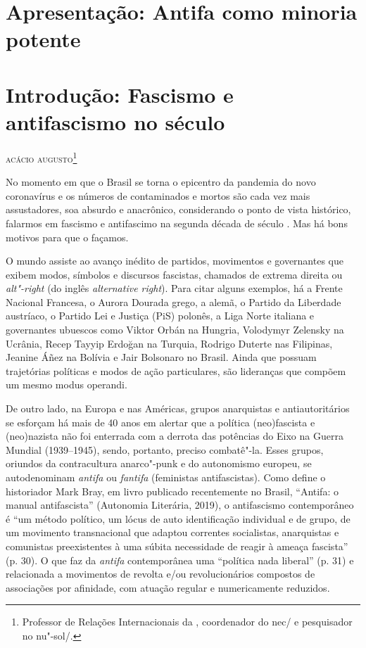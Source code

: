 
\chapter{Apresentação: Antifa como minoria potente}

\lipsum[5]
\lipsum[2]
\lipsum[1]

\chapter{Introdução: Fascismo e antifascismo no século }

\hfill{}\textsc{acácio augusto\footnote{Professor de Relações Internacionais da , coordenador do nec/ e pesquisador no nu"-sol/.}}

\bigskip

No momento em que o Brasil se torna o epicentro da pandemia do novo
coronavírus e os números de contaminados e mortos são cada vez mais
assustadores, soa absurdo e anacrônico, considerando o ponto de vista
histórico, falarmos em fascismo e antifascimo na segunda década de
século . Mas há bons motivos para que o façamos.

O mundo assiste ao avanço inédito de partidos, movimentos e governantes
que exibem modos, símbolos e discursos fascistas, chamados de extrema
direita ou \emph{alt"-right} (do inglês \emph{alternative right}). Para
citar alguns exemplos, há a Frente Nacional Francesa, o Aurora Dourada
grego, a  alemã, o Partido da Liberdade austríaco, o Partido Lei e
Justiça (PiS) polonês, a Liga Norte italiana e governantes ubuescos como
Viktor Orbán na Hungria, Volodymyr Zelensky na Ucrânia, Recep Tayyip
Erdoğan na Turquia, Rodrigo Duterte nas Filipinas, Jeanine Áñez na
Bolívia e Jair Bolsonaro no Brasil. Ainda que possuam trajetórias
políticas e modos de ação particulares, são lideranças que compõem um
mesmo modus operandi.

De outro lado, na Europa e nas Américas, grupos anarquistas e
antiautoritários se esforçam há mais de 40 anos em alertar que a
política (neo)fascista e (neo)nazista não foi enterrada com a derrota
das potências do Eixo na  Guerra Mundial (1939--1945), sendo, portanto,
preciso combatê"-la. Esses grupos, oriundos da contracultura anarco"-punk
e do autonomismo europeu, se autodenominam \emph{antifa} ou
\emph{fantifa} (feministas antifascistas). Como define o historiador
Mark Bray, em livro publicado recentemente no Brasil, ``Antifa: o manual
antifascista'' (Autonomia Literária, 2019), o antifascismo contemporâneo
é ``um método político, um lócus de auto identificação individual e de
grupo, de um movimento transnacional que adaptou correntes socialistas,
anarquistas e comunistas preexistentes à uma súbita necessidade de
reagir à ameaça fascista'' (p. 30). O que faz da \emph{antifa}
contemporânea uma ``política nada liberal'' (p. 31) e relacionada a
movimentos de revolta e/ou revolucionários compostos de associações por
afinidade, com atuação regular e numericamente reduzidos.

